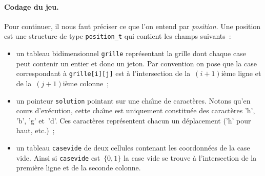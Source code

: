\paragraph{Codage du jeu.}
Pour continuer, il nous faut pr\'eciser ce que l'on entend par
\textit{position}. Une position est une structure de type
\texttt{position\_t} qui contient les champs suivants~:
\begin{itemize}
\item un tableau bidimensionnel \texttt{grille} repr\'esentant la
  grille dont chaque case peut contenir un entier et donc un jeton.
  Par convention on pose que la case correspondant \`a
  \texttt{grille[i][j]} est \`a l'intersection de la~${(i+1)}$i\`eme
  ligne et de la~${(j+1)}$i\`eme colonne~;
\item un pointeur \texttt{solution} pointant sur une cha\^\i{}ne de
  caract\`eres. Notons qu'en cours d'ex\'ecution, cette cha\^\i{}ne
  est uniquement constitu\'ee des caract\`eres 'h', 'b', 'g' et~'d'.
  Ces caract\`eres repr\'esentent chacun un d\'eplacement ('h' pour
  haut, etc.)~;
\item un tableau \texttt{casevide} de deux cellules contenant les
  coordonn\'ees de la case vide. Ainsi si \texttt{casevide} est~${\{0,1\}}$ la
  case vide se trouve \`a l'intersection de la premi\`ere ligne et de
  la seconde colonne.
\end{itemize}
